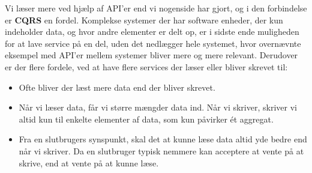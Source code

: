 Vi læser mere ved hjælp af API'er end vi nogenside har gjort, og i den forbindelse er \textbf{CQRS} en fordel. Komplekse systemer der har software enheder, der kun indeholder data, og hvor andre elementer er delt op, er i sidste ende muligheden for at lave service på en del, uden det nedlægger hele systemet, hvor overnævnte eksempel med API'er mellem systemer bliver mere og mere relevant. 
Derudover er der flere fordele, ved at have flere services der læser eller bliver skrevet til:
\begin{itemize}
    \item Ofte bliver der læst mere data end der bliver skrevet.
    \item Når vi læser data, får vi større mængder data ind. Når vi skriver, skriver vi altid kun til enkelte elementer af data, som kun påvirker ét aggregat.
    \item Fra en slutbrugers synspunkt, skal det at kunne læse data altid yde bedre end når vi skriver. Da en slutbruger typisk nemmere kan acceptere at vente på at skrive, end at vente på at kunne læse.
\end{itemize}